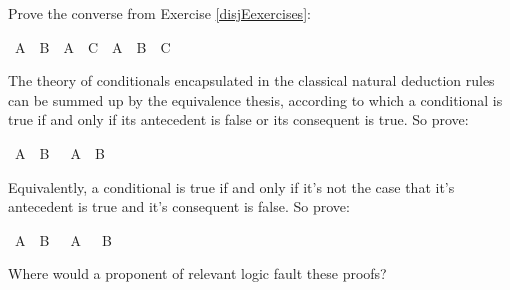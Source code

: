 \begin{isabellebody}
\begin{isamarkuptext}
\end{isamarkuptext}\isamarkuptrue%
%
\begin{isamarkuptext}%
\begin{Exercise}  Prove the converse from Exercise \ref{disjEexercises}: \end{Exercise}%
\end{isamarkuptext}\isamarkuptrue%
\isamarkupfalse%
\ {\isachardoublequoteopen}{\isacharparenleft}A\ {\isasymor}\ B{\isacharparenright}\ {\isasymand}\ {\isacharparenleft}A\ {\isasymor}\ C{\isacharparenright}\ {\isasymlongrightarrow}\ A\ {\isasymor}\ B\ {\isasymand}\ C{\isachardoublequoteclose}%
\isadelimproof
\ %
\endisadelimproof
%
\isatagproof
{}\isamarkupfalse%
%
\endisatagproof
{\isafoldproof}%
%
\isadelimproof
%
\endisadelimproof
%
\begin{isamarkuptext}%
\begin{Exercise}[title = The Equivalence Thesis]
The theory of conditionals encapsulated in the classical natural deduction rules can be
summed up by the equivalence thesis, according to which a conditional is true if and only if
its antecedent is false or its consequent is true. So prove:  \end{Exercise}%
\end{isamarkuptext}\isamarkuptrue%
\isamarkupfalse%
\ {\isachardoublequoteopen}{\isacharparenleft}A\ {\isasymlongrightarrow}\ B{\isacharparenright}\ {\isasymlongleftrightarrow}\ {\isacharparenleft}{\isasymnot}\ A\ {\isasymor}\ B{\isacharparenright}{\isachardoublequoteclose}%
\isadelimproof
\ %
\endisadelimproof
%
\isatagproof
{}\isamarkupfalse%
%
\endisatagproof
{\isafoldproof}%
%
\isadelimproof
%
\endisadelimproof
%
\begin{isamarkuptext}%
Equivalently, a conditional is true if and only if it's not the case that it's antecedent is
true and it's consequent is false. So prove:%
\end{isamarkuptext}\isamarkuptrue%
\isamarkupfalse%
\ {\isachardoublequoteopen}{\isacharparenleft}A\ {\isasymlongrightarrow}\ B{\isacharparenright}\ {\isasymlongleftrightarrow}\ {\isasymnot}\ {\isacharparenleft}A\ {\isasymand}\ {\isasymnot}\ B{\isacharparenright}{\isachardoublequoteclose}%
\isadelimproof
\ %
\endisadelimproof
%
\isatagproof
{}\isamarkupfalse%
%
\endisatagproof
{\isafoldproof}%
%
\isadelimproof
%
\endisadelimproof
%
\begin{isamarkuptext}%
Where would a proponent of relevant logic fault these proofs?%

\end{isamarkuptext}
\end{isabellebody}
